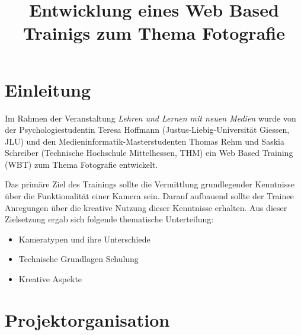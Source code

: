 \documentclass{article}
\title{Entwicklung eines Web Based Trainigs zum Thema Fotografie}
\begin{document}
%
\maketitle
%
\section{Einleitung}
\label{sec:intro}

Im Rahmen der Veranstaltung \emph{Lehren und Lernen mit neuen Medien} wurde von der Psychologiestudentin Teresa Hoffmann (Justus-Liebig-Universit\"at Giessen, JLU) und den Medieninformatik-Masterstudenten Thomas Rehm und Saskia Schreiber (Technische Hochschule Mittelhessen, THM) ein Web Based Training (WBT) zum Thema Fotografie entwickelt.

Das prim\"are Ziel des Trainings sollte die Vermittlung grundlegender Kenntnisse \"uber die Funktionalit\"at einer Kamera sein. Darauf aufbauend sollte der Trainee Anregungen \"uber die kreative Nutzung dieser Kenntnisse erhalten.
Aus dieser Zielsetzung ergab sich folgende thematische Unterteilung:



\begin{itemize}
\item Kameratypen und ihre Unterschiede
\item Technische Grundlagen Schulung
\item Kreative Aspekte

\end{itemize}


\section{Projektorganisation}
\label{sec:orga}
\end{document}
